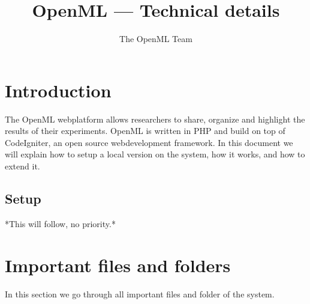 \documentclass[10pt]{article}
\author{The OpenML Team}
\title{OpenML --- Technical details}
\begin{document}

\maketitle
\section{Introduction} 

The OpenML webplatform allows researchers to share, organize and highlight the results of their experiments. OpenML is written in PHP and build on top of CodeIgniter, an open source webdevelopment framework. In this document we will explain how to setup a local version on the system, how it works, and how to extend it. 

\subsection{Setup}

*This will follow, no priority.*

\section{Important files and folders}
In this section we go through all important files and folder of the system.
\end{document}
